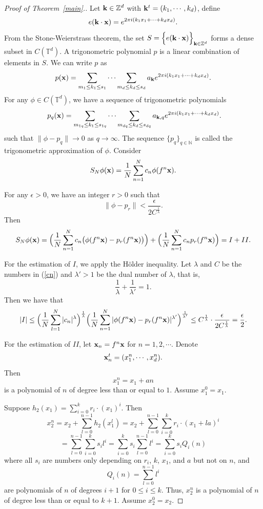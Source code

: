 \documentclass[10pt,a4paper]{amsart}
\newcommand {\N} {{\mathbb N}}
\newcommand {\Td} {{\mathbb T}^{d}}
\newcommand {\Z} {{\mathbb Z}}
\begin{document}
\begin{proof}[Proof of Theorem~\ref{main}.]
Let ${\bf k}\in \Z^{d}$ with ${\bf k}^{t}=(k_{1}, \cdots,k_{d})$, define
$$
e({\bf k}\cdot {\bf x}) = e^{2\pi i (k_{1}x_{1}+\cdots + k_{d}x_{d})}.
$$
From the Stone-Weierstrass theorem, 
the set 
$S=\Big\{ e({\bf k}\cdot {\bf x})\Big\}_{{\bf k}\in \Z^{d}}$ 
forms a dense subset in $C(\Td)$.
A trigonometric polynomial $p$ is a linear combination of elements in $S$. We can write $p$ as 
$$
p({\bf x}) = \sum_{m_{1}\leq k_{1}\leq s_{1}}\cdots \sum_{m_{d}\leq k_{d}\leq s_{d}} a_{\bf k} e^{2\pi i (k_{1}x_{1}+\cdots +k_{d}x_{d})}.
$$
For any $\phi\in C(\Td)$, we have a sequence of trigonometric polynomials 
\begin{equation}~\label{stp}
p_{q}({\bf x}) = \sum_{m_{1q}\leq k_{1}\leq s_{1q}}\cdots \sum_{m_{dq}\leq k_{d}\leq s_{dq}} a_{{\bf k}, q} e^{2\pi i (k_{1}x_{1}+\cdots +k_{d}x_{d})}.
\end{equation}
such that $\|\phi-p_{q}\|\to 0$ as $q\to \infty$. The sequence $\{p_{q}\}_{q\in\N}$ is called the trigonometric approximation of $\phi$.
Consider
$$
S_{N}\phi ({\bf x}) = \frac{1}{N} \sum_{n=1}^{N} c_{n} \phi(f^{n} {\bf x}).
$$
 
For any $\epsilon>0$, we have an integer $r>0$ such that
$$
\| \phi-p_{r}\| <\frac{\epsilon}{2C^{\frac{1}{\lambda}}}.
$$
Then 
$$
S_{N}\phi ({\bf x}) =\Big( \frac{1}{N} \sum_{n=1}^{N} c_{n} \big( \phi(f^{n} {\bf x}) -p_{r} (f^{n} {\bf x})\big)\Big) +\Big( \frac{1}{N} \sum_{n=1}^{N} c_{n} p_{r} (f^{n} {\bf x})\Big) =I+II.
$$

For the estimation of $I$, we apply the H\"older inequality. Let $\lambda$ and $C$ be the numbers in (\ref{cn}) and $\lambda'>1$ be the dual number of $\lambda$, that is, 
$$
\frac{1}{\lambda} +\frac{1}{\lambda'}=1.
$$ 
Then we have that
$$
|I|\leq \Big( \frac{1}{N} \sum_{l=1}^{N} |c_{n}|^{\lambda}\Big)^{\frac{1}{\lambda}} 
 \Big( \frac{1}{N} \sum_{n=1}^{N} |\phi(f^{n} {\bf x})-p_{r}(f^{n} {\bf x})|^{\lambda'}\Big)^{\frac{1}{\lambda'}}
\leq C^{\frac{1}{\lambda}} \cdot \frac{\epsilon}{2C^{\frac{1}{\lambda}}} =\frac{\epsilon}{2}.
$$

For the estimation of $II$, let ${\bf x}_{n}=f^{n}{\bf x}$ for $n=1, 2,\cdots$.
Denote 
$$
{\bf x}_{n}^{t}=(x_{1}^{n},\cdots, x_{d}^{n}).
$$
Then 
$$
x_{1}^{n} = x_{1} + an
$$
is a polynomial of $n$ of degree less than or equal to $1$. Assume $x_{1}^{0}=x_{1}$. 

Suppose $h_{2} (x_{1}) = \sum_{i=0}^{k} r_{i} \cdot (x_{1})^{i}$. Then
$$
x_{2}^{n} = x_{2} +\sum_{l=0}^{n-1} h_{2}(x_{1}^{l})= x_{2}+\sum_{l=0}^{n-1} \sum_{i=0}^{k} r_{i} \cdot (x_{1}+la)^{i}
$$
$$
= \sum_{l=0}^{n-1} \sum_{i=0}^{k} s_{i} l^{i}
=\sum_{i=0}^{k} s_{i} \sum_{l=0}^{n-1} l^{i}= \sum_{i=0}^{k} s_{i} Q_{i}(n)
$$
where all $s_{i}$ are numbers only depending on $r_{i}$, $k$, $x_{1}$, and $a$ but not on $n$, and
$$
Q_{i}(n) = \sum_{l=0}^{n-1} l^{i}
$$ 
are polynomials of $n$ of degrees $i+1$ for $0\leq i\leq k$. 
Thus, $x_{2}^{n}$ is a polynomial of $n$ of degree less than or equal to $k+1$. Assume $x_{2}^{0}=x_{2}$.


\end{proof}
\end{document}
